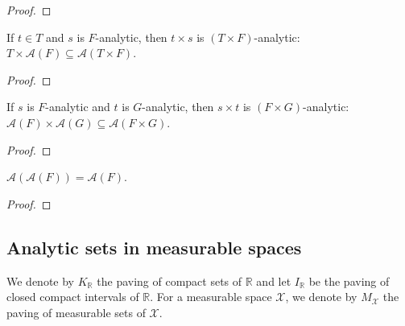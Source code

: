\begin{proof}\leanok

\end{proof}


\begin{lemma}\label{lem:IsPavingAnalytic.prod_left}
  \leanok
If $t \in T$ and $s$ is $F$-analytic, then $t \times s$ is $(T \times F)$-analytic: $T \times \mathcal{A}(F) \subseteq \mathcal{A}(T \times F)$.
\end{lemma}

\begin{proof}\leanok

\end{proof}


\begin{lemma}\label{lem:IsPavingAnalytic.prod}
  \leanok
If $s$ is $F$-analytic and $t$ is $G$-analytic, then $s \times t$ is $(F \times G)$-analytic: $\mathcal{A}(F) \times \mathcal{A}(G) \subseteq \mathcal{A}(F \times G)$.
\end{lemma}

\begin{proof}\leanok

\end{proof}


\begin{lemma}\label{lem:isPavingAnalytic_isPavingAnalytic}
  \leanok
$\mathcal{A}(\mathcal{A}(F)) = \mathcal{A}(F)$.
\end{lemma}

\begin{proof}\leanok

\end{proof}



\subsection{Analytic sets in measurable spaces}

We denote by $K_{\mathbb{R}}$ the paving of compact sets of $\mathbb{R}$ and let $I_{\mathbb{R}}$ be the paving of closed compact intervals of $\mathbb{R}$.
For a measurable space $\mathcal{X}$, we denote by $M_{\mathcal{X}}$ the paving of measurable sets of $\mathcal{X}$.

